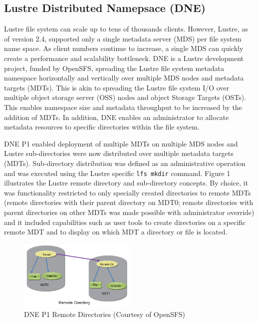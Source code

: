 \documentclass[conference,compsoc]{IEEEtran}
\begin{document}
\subsection{Lustre Distributed Namepsace (DNE)}

Lustre file system can scale up to tens of thousands clients. However, Lustre,
as of version 2.4, supported only a single metadata server (MDS) per file
system name space. As client numbers continue to increase, a single MDS can quickly
create a performance and scalability bottleneck. DNE is a Lustre development
project, funded by OpenSFS, spreading the Lustre file system metadata namespace
horizontally and vertically over multiple MDS nodes and metadata targets
(MDTs). This is akin to spreading the Lustre file system I/O over multiple
object storage server (OSS) nodes and object Storage Targets (OSTs). This
enables namespace size and metadata throughput to be increased by the addition
of MDTs. In addition, DNE enables an administrator to allocate metadata
resources to specific directories within the file system. 

DNE P1 enabled deployment of multiple MDTs on multiple MDS nodes and Lustre
sub-directories were now distributed over multiple metadata targets (MDTs).
Sub-directory distribution was defined as an administrative operation and was
executed using the Lustre specific {\footnotesize{\texttt{lfs mkdir}}} command. Figure 1 illustrates the
Lustre remote directory and sub-directory concepts. By choice, it was
functionality restricted to only specially created directories to remote MDTs
(remote directories with their parent directory on MDT0; remote directories
with parent directories on other MDTs was made possible with administrator
override) and it included capabilities such as user tools to create directories
on a specific remote MDT and to display on which MDT a directory or file is
located. 


\begin{figure}[!ht]
  \centering
    \includegraphics[width=0.5\textwidth]{figs/dnep1}
  \caption{DNE P1 Remote Directories (Courtesy of OpenSFS)}
\end{figure}
 
\end{document}
